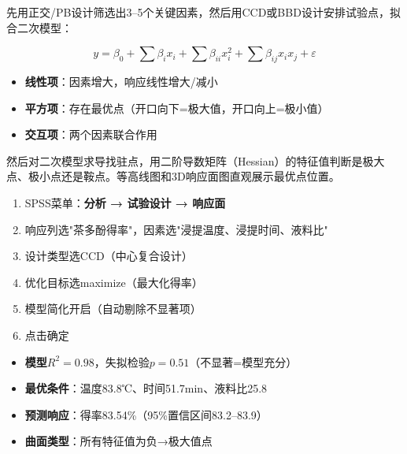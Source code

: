 \begin{algoprinciple}
先用正交/PB设计筛选出3--5个关键因素，然后用CCD或BBD设计安排试验点，拟合二次模型：

\[ y = \beta_0 + \sum\beta_i x_i + \sum\beta_{ii} x_i^2 + \sum\beta_{ij} x_i x_j + \varepsilon \]

\begin{itemize}
    \item \textbf{线性项}：因素增大，响应线性增大/减小
    \item \textbf{平方项}：存在最优点（开口向下=极大值，开口向上=极小值）
    \item \textbf{交互项}：两个因素联合作用
\end{itemize}

然后对二次模型求导找驻点，用二阶导数矩阵（Hessian）的特征值判断是极大点、极小点还是鞍点。等高线图和3D响应面图直观展示最优点位置。
\end{algoprinciple}

\begin{algosposs}
\begin{enumerate}
    \item SPSS菜单：\textbf{分析 → 试验设计 → 响应面}
    \item 响应列选"茶多酚得率"，因素选"浸提温度、浸提时间、液料比"
    \item 设计类型选CCD（中心复合设计）
    \item 优化目标选maximize（最大化得率）
    \item 模型简化开启（自动剔除不显著项）
    \item 点击确定
\end{enumerate}
\end{algosposs}

\begin{algoresult}
\begin{itemize}
    \item \textbf{模型$R^2=0.98$}，失拟检验$p=0.51$（不显著=模型充分）
    \item \textbf{最优条件}：温度83.8℃、时间51.7min、液料比25.8
    \item \textbf{预测响应}：得率83.54\%（95\%置信区间83.2--83.9）
    \item \textbf{曲面类型}：所有特征值为负→极大值点
\end{itemize}
\end{algoresult}

